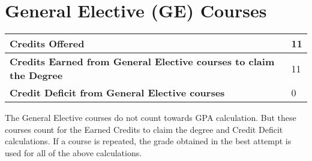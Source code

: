 \documentclass[12pt]{article}
\begin{document}
\begin{table}[H]
\begin{tabularx}{\textwidth}{
    |>{\hsize=1.0\hsize}X| 
    >{\hsize=0.7\hsize}X|
    >{\hsize=2.4\hsize}X|
    >{\hsize=0.6\hsize}X|
    >{\hsize=0.6\hsize}X|
    >{\hsize=0.7\hsize}X|
  }

\end{tabularx}
\end{table}

\section*{General Elective (GE) Courses}

\begin{tabularx}{\textwidth}{|X|l|}
\hline 
\textbf{Credits Offered} & 11 \\ \hline 
\textbf{Credits Earned from General Elective courses to claim the Degree} & 11 \\ \hline 
\textbf{Credit Deficit from General Elective courses} & 0 \\
\hline 
\end{tabularx}

\vspace{10pt}

\noindent The General Elective courses do not count towards GPA calculation. But these courses count for the Earned Credits to claim the degree and Credit Deficit calculations. If a course is repeated, the grade obtained in the best attempt is used for all of the above calculations.
\end{document}
